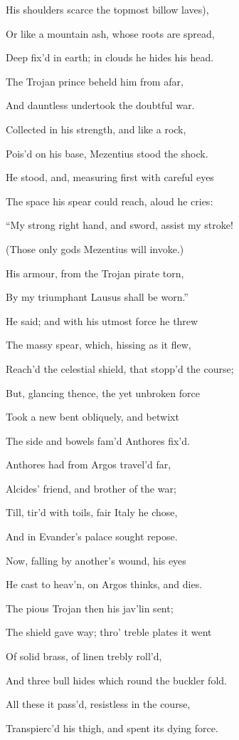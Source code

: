 His shoulders scarce the topmost billow laves),

Or like a mountain ash, whose roots are spread,

Deep fix’d in earth; in clouds he hides his head.

The Trojan prince beheld him from afar,

And dauntless undertook the doubtful war.

Collected in his strength, and like a rock,

Pois’d on his base, Mezentius stood the shock.

He stood, and, measuring first with careful eyes

The space his spear could reach, aloud he cries:

“My strong right hand, and sword, assist my stroke!

(Those only gods Mezentius will invoke.)

His armour, from the Trojan pirate torn,

By my triumphant Lausus shall be worn.”

He said; and with his utmost force he threw

The massy spear, which, hissing as it flew,

Reach’d the celestial shield, that stopp’d the course;

But, glancing thence, the yet unbroken force

Took a new bent obliquely, and betwixt

The side and bowels fam’d Anthores fix’d.

Anthores had from Argos travel’d far,

Alcides’ friend, and brother of the war;

Till, tir’d with toils, fair Italy he chose,

And in Evander’s palace sought repose.

Now, falling by another’s wound, his eyes

He cast to heav’n, on Argos thinks, and dies.

The pious Trojan then his jav’lin sent;

The shield gave way; thro’ treble plates it went

Of solid brass, of linen trebly roll’d,

And three bull hides which round the buckler fold.

All these it pass’d, resistless in the course,

Transpierc’d his thigh, and spent its dying force.

